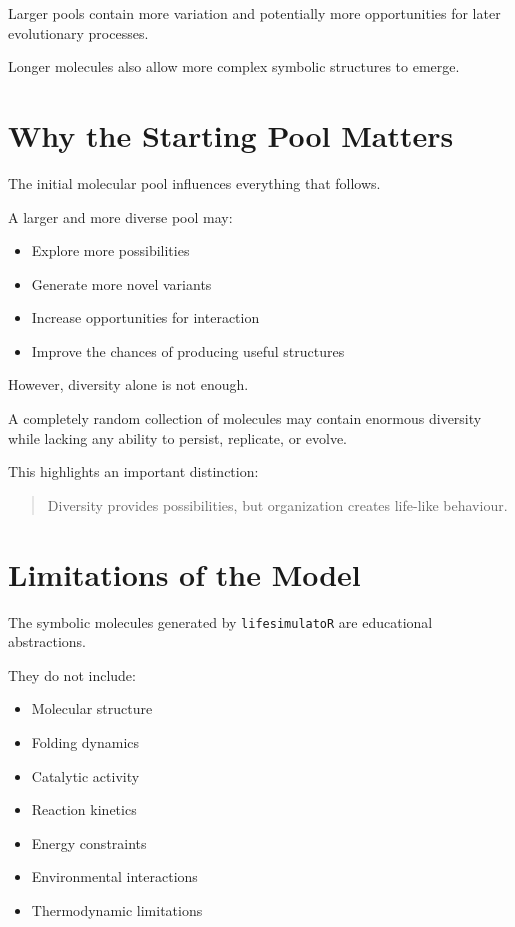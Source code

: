 \documentclass[
  oneside,
  openany]{book}
\providecommand{\tightlist}{%
  \setlength{\itemsep}{0pt}\setlength{\parskip}{0pt}}
\begin{document}
Larger pools contain more variation and potentially more opportunities for later evolutionary processes.

Longer molecules also allow more complex symbolic structures to emerge.

\section{Why the Starting Pool Matters}\label{why-the-starting-pool-matters}

The initial molecular pool influences everything that follows.

A larger and more diverse pool may:

\begin{itemize}
\tightlist
\item
  Explore more possibilities
\item
  Generate more novel variants
\item
  Increase opportunities for interaction
\item
  Improve the chances of producing useful structures
\end{itemize}

However, diversity alone is not enough.

A completely random collection of molecules may contain enormous diversity while lacking any ability to persist, replicate, or evolve.

This highlights an important distinction:

\begin{quote}
Diversity provides possibilities, but organization creates life-like behaviour.
\end{quote}

\section{Limitations of the Model}\label{limitations-of-the-model}

The symbolic molecules generated by \texttt{lifesimulatoR} are educational abstractions.

They do not include:

\begin{itemize}
\tightlist
\item
  Molecular structure
\item
  Folding dynamics
\item
  Catalytic activity
\item
  Reaction kinetics
\item
  Energy constraints
\item
  Environmental interactions
\item
  Thermodynamic limitations
\end{itemize}
\end{document}
